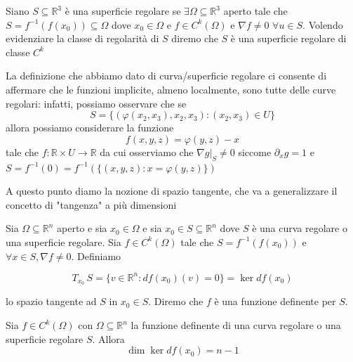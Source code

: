 \vspace{0.5cm}
\begin{definition}[\textcolor{blue}{Superficie regolare}]
Siano $S \subseteq \mathbb{R}^3$ è una superficie regolare se $\exists \Omega \subseteq \mathbb{R}^3$ aperto tale che $S = f^{-1}(f(x_0)) \subseteq \Omega$ dove $x_0 \in \Omega$ e $f \in C^k(\Omega)$ e $\nabla f \neq 0 \, \, \forall u \in S$. Volendo evidenziare la classe di regolarità di $S$ diremo che $S$ è una superficie regolare di classe $C^k$
\end{definition}

\begin{remark}
La definizione che abbiamo dato di curva/superficie regolare ci consente di affermare che le funzioni implicite, almeno localmente, sono tutte delle curve regolari: infatti, possiamo osservare che se 
$$
S= \{ (\varphi(x_2, x_3), x_2, x_3): (x_2, x_3) \in U \}
$$
allora possiamo considerare la funzione
$$
f(x, y, z) = \varphi(y, z) - x
$$
tale che $f: \mathbb{R} \times U \to \mathbb{R}$ da cui osserviamo che $\nabla g|_{S} \neq 0$ siccome $\partial_x g = 1$ e $S = f^{-1}(0) = f^{-1}(\{ (x, y, z) : x = \varphi(y, z) \})$
\end{remark}

A questo punto diamo la nozione di spazio tangente, che va a generalizzare il concetto di "tangenza" a più dimensioni

\vspace{0.5cm}
\begin{definition}[\textcolor{blue}{Spazio tangente}]
Sia $\Omega \subseteq \mathbb{R}^n$ aperto e sia $x_0 \in \Omega$ e sia $x_0 \in S \subseteq \mathbb{R}^n$ dove $S$ è una curva regolare o una superficie regolare. Sia $f \in C^k(\Omega)$ tale che $S = f^{-1}(f(x_0))$ e $\forall x \in S, \nabla f \neq 0$. Definiamo

$$
T_{x_0} \, S = \{v \in \mathbb{R}^n: df(x_0)(v) = 0 \} = \ker{df(x_0)}
$$

lo spazio tangente ad $S$ in $x_0 \in S$. Diremo che $f$ è una funzione definente per $S$.
\end{definition}

\vspace{0.5cm}
\begin{prop}[\textcolor{blue}{Dimensione dello spazio tangente}]
Sia $f \in C^{k}(\Omega)$ con $\Omega \subseteq \mathbb{R}^n$ la funzione definente di una curva regolare o una superficie regolare $S$. Allora 
$$
\dim{\ker{df(x_0)}} = n-1
$$
\end{prop}

